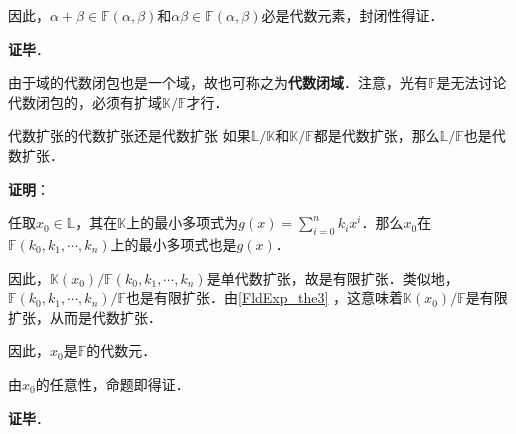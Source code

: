 因此，$\alpha+\beta\in\mathbb{F}(\alpha, \beta)$和$\alpha\beta\in\mathbb{F}(\alpha, \beta)$必是代数元素，封闭性得证．

\textbf{证毕}．


由于域的代数闭包也是一个域，故也可称之为\textbf{代数闭域}．注意，光有$\mathbb{F}$是无法讨论代数闭包的，必须有扩域$\mathbb{K}/\mathbb{F}$才行．


\begin{corollary}{代数扩张的代数扩张还是代数扩张}\label{FldExp_cor2}
如果$\mathbb{L}/\mathbb{K}$和$\mathbb{K}/\mathbb{F}$都是代数扩张，那么$\mathbb{L}/\mathbb{F}$也是代数扩张．
\end{corollary}

\textbf{证明}：

任取$x_0\in\mathbb{L}$，其在$\mathbb{K}$上的最小多项式为$g(x) = \sum_{i=0}^n k_ix^i$．那么$x_0$在$\mathbb{F}(k_0, k_1, \cdots, k_n)$上的最小多项式也是$g(x)$．

因此，$\mathbb{K}(x_0)/\mathbb{F}(k_0, k_1, \cdots, k_n)$是单代数扩张，故是有限扩张．类似地，$\mathbb{F}(k_0, k_1, \cdots, k_n)/\mathbb{F}$也是有限扩张．由\autoref{FldExp_the3} ，这意味着$\mathbb{K}(x_0)/\mathbb{F}$是有限扩张，从而是代数扩张．

因此，$x_0$是$\mathbb{F}$的代数元．

由$x_0$的任意性，命题即得证．

\textbf{证毕}．





